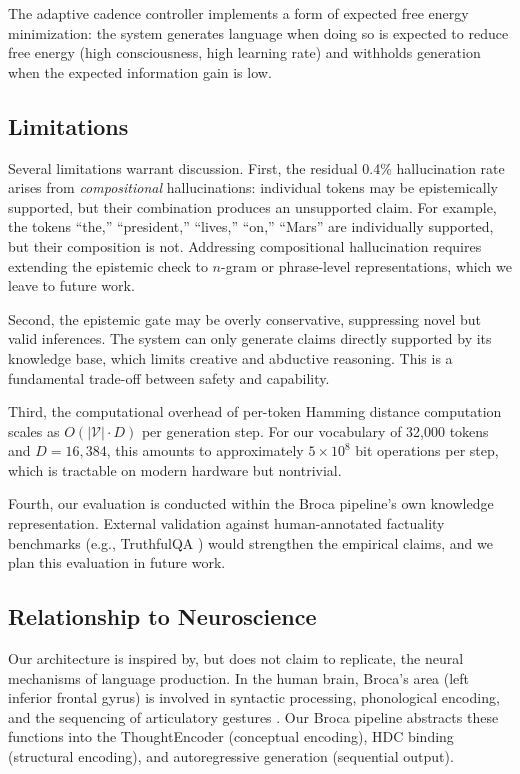 \documentclass[12pt,a4paper]{article}
\begin{document}
The adaptive cadence controller implements a form of expected free energy minimization: the system generates language when doing so is expected to reduce free energy (high consciousness, high learning rate) and withholds generation when the expected information gain is low.

\subsection{Limitations}
\label{sec:limitations}

Several limitations warrant discussion. First, the residual 0.4\% hallucination rate arises from \emph{compositional} hallucinations: individual tokens may be epistemically supported, but their combination produces an unsupported claim. For example, the tokens ``the,'' ``president,'' ``lives,'' ``on,'' ``Mars'' are individually supported, but their composition is not. Addressing compositional hallucination requires extending the epistemic check to $n$-gram or phrase-level representations, which we leave to future work.

Second, the epistemic gate may be overly conservative, suppressing novel but valid inferences. The system can only generate claims directly supported by its knowledge base, which limits creative and abductive reasoning. This is a fundamental trade-off between safety and capability.

Third, the computational overhead of per-token Hamming distance computation scales as $O(|\mathcal{V}| \cdot D)$ per generation step. For our vocabulary of 32,000 tokens and $D = 16{,}384$, this amounts to approximately $5 \times 10^8$ bit operations per step, which is tractable on modern hardware but nontrivial.

Fourth, our evaluation is conducted within the Broca pipeline's own knowledge representation. External validation against human-annotated factuality benchmarks (e.g., TruthfulQA \citep{lin2022truthfulqa}) would strengthen the empirical claims, and we plan this evaluation in future work.

\subsection{Relationship to Neuroscience}

Our architecture is inspired by, but does not claim to replicate, the neural mechanisms of language production. In the human brain, Broca's area (left inferior frontal gyrus) is involved in syntactic processing, phonological encoding, and the sequencing of articulatory gestures \citep{hagoort2005broca}. Our Broca pipeline abstracts these functions into the ThoughtEncoder (conceptual encoding), HDC binding (structural encoding), and autoregressive generation (sequential output).
\end{document}
